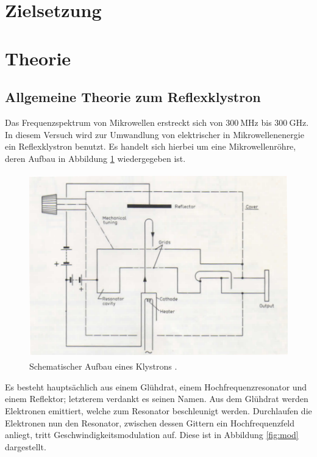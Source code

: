 \section{Zielsetzung}


\section{Theorie}
\label{sec:Theorie}
\subsection{Allgemeine Theorie zum Reflexklystron}

Das Frequenzspektrum von Mikrowellen erstreckt sich von $\SI{300}{\mega\hertz}$ bis $\SI{300}{\giga\hertz}$.
In diesem Versuch wird zur Umwandlung von elektrischer in Mikrowellenenergie ein Reflexklystron benutzt.
Es handelt sich hierbei um eine Mikrowellenröhre, deren Aufbau in Abbildung \ref{fig:klystron} wiedergegeben ist.

\begin{figure}
  \centering
  \includegraphics[height=8cm]{ressources/theorie.png}
  \caption{Schematischer Aufbau eines Klystrons \cite{skript}.}
  \label{fig:klystron}
\end{figure}

Es besteht hauptsächlich aus einem Glühdrat, einem Hochfrequenzresonator und einem Reflektor; letzterem verdankt es seinen Namen.
Aus dem Glühdrat werden Elektronen emittiert, welche zum Resonator beschleunigt werden.
Durchlaufen die Elektronen nun den Resonator, zwischen dessen Gittern ein Hochfrequenzfeld anliegt, tritt Geschwindigkeitsmodulation auf.
Diese ist in Abbildung \ref{fig:mod} dargestellt.

